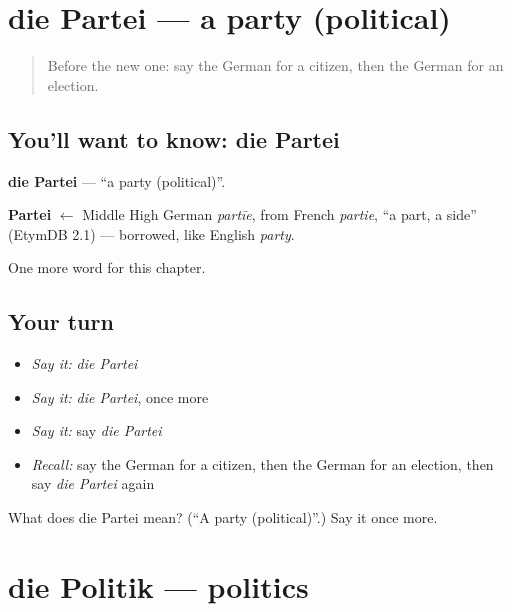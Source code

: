 \section[die Partei]{die Partei — a party (political)}

\label{lesson:GE-C209-partei}



\begin{quote}
Before the new one: say the German for a citizen, then the German for an election.
\end{quote}

\subsection*{You'll want to know: die Partei}
\textbf{die Partei} — \textquotedblleft{}a party (political)\textquotedblright{}.

\begin{cousinweb}
\textbf{Partei} $\leftarrow$ Middle High German \emph{partīe}, from French \emph{partie}, \textquotedblleft{}a part, a side\textquotedblright{} (EtymDB 2.1) — borrowed, like English \emph{party}.
\end{cousinweb}

\begin{grammarlens}[title={What you've built}]
One more word for this chapter.
\end{grammarlens}

\subsection*{Your turn}
\begin{itemize}
\raggedright
  \item \emph{Say it:} \emph{die Partei}
  \item \emph{Say it:} \emph{die Partei}, once more
  \item \emph{Say it:} say \emph{die Partei}
  \item \emph{Recall:} say the German for a citizen, then the German for an election, then say \emph{die Partei} again
\end{itemize}

\begin{tcolorbox}[breakable,colback=teal!4,colframe=teal!35!black,title={Before you move on}]
What does die Partei mean? (\textquotedblleft{}A party (political)\textquotedblright{}.) Say it once more.
\end{tcolorbox}
\section[die Politik]{die Politik — politics}

